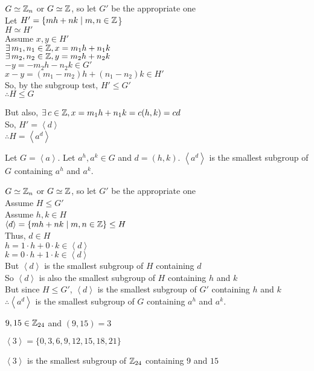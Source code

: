 \documentclass[letterpaper,12pt,fleqn]{article}
\newcommand{\cycle}[1]{\left<#1\right>}
\begin{document}
\begin{theproof}
  $G\simeq\mathbb{Z}_n$ or $G\simeq\mathbb{Z}$, so let $G'$ be the appropriate one \\
  Let $H'=\{mh+nk\mid m,n\in\mathbb{Z}$\} \\
  $H\simeq H'$ \\
  Assume $x,y\in H'$ \\
  $\exists\,m_1,n_1\in\mathbb{Z},x=m_1h+n_1k$ \\
  $\exists\,m_2,n_2\in\mathbb{Z},y=m_2h+n_2k$ \\
  $-y=-m_2h-n_2k\in G'$ \\
  $x-y=(m_1-m_2)h+(n_1-n_2)k\in H'$ \\
  So, by the subgroup test, $H'\le G'$ \\
  $\therefore H\le G$

  But also, $\exists\,c\in\mathbb{Z},x=m_1h+n_1k=c(h,k)=cd$ \\
  So, $H'=\cycle{d}$ \\
  $\therefore H=\cycle{a^d}$
\end{theproof}

\begin{corollary}
  Let $G=\cycle{a}$. Let $a^h,a^k\in G$ and $d=(h,k)$. $\cycle{a^d}$ is the
  smallest subgroup of $G$ containing $a^h$ and $a^k$.
\end{corollary}

\begin{theproof}
  $G\simeq\mathbb{Z}_n$ or $G\simeq\mathbb{Z}$, so let $G'$ be the appropriate one \\
  Assume $H\le G'$ \\
  Assume $h,k\in H$ \\
  $\cycle{d}=\{mh+nk\mid m,n\in\Z\}\le H$ \\
  Thus, $d\in H$ \\
  $h=1\cdot h+0\cdot k\in\cycle{d}$ \\
  $k=0\cdot h+1\cdot k\in\cycle{d}$ \\
  But $\cycle{d}$ is the smallest subgroup of $H$ containing $d$ \\
  So $\cycle{d}$ is also the smallest subgroup of $H$ containing $h$ and $k$ \\
  But since $H\le G'$, $\cycle{d}$ is the smallest subgroup of $G'$ containing
  $h$ and $k$ \\
  $\therefore \cycle{a^d}$ is the smallest subgroup of $G$ containing $a^h$
  and $a^k$.
\end{theproof}

\begin{example}
  $9,15\in\mathbb{Z}_{24}$ and $(9,15)=3$

  $\cycle{3}=\{0,3,6,9,12,15,18,21\}$

  $\cycle{3}$ is the smallest subgroup of $\mathbb{Z}_{24}$ containing $9$ and $15$
\end{example}
\end{document}
